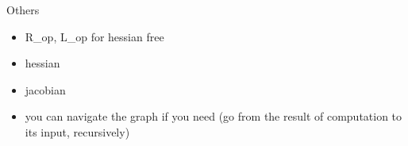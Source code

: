 \documentclass[utf8x,xcolor=pdftex,dvipsnames,table]{beamer}
\begin{document}



\begin{frame}{Others}
  \begin{itemize}
  \item R\_op, L\_op for hessian free
  \item hessian
  \item jacobian
  \item you can navigate the graph if you need
      (go from the result of computation to its input, recursively)
  \end{itemize}
\end{frame}
\end{document}
